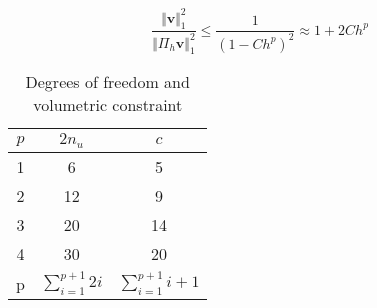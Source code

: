 \begin{equation}
\frac{\Vert \boldsymbol v \Vert_1^2}{\Vert \Pi_h \boldsymbol v \Vert_1^2} \le \frac{1}{(1-Ch^p)^2} \approx 1 + 2Ch^p
\end{equation}

\begin{table}[ht!]
\centering
\caption{Degrees of freedom and volumetric constraint}
\begin{tabular}{ccc}
\toprule
$p$ & $2n_u$ & $c$ \\
\midrule
1 & 6 & 5 \\
2 & 12 & 9 \\
3 & 20 & 14 \\
4 & 30 & 20 \\
p & $\sum_{i=1}^{p+1}2i$ & $\sum_{i=1}^{p+1}i+1$ \\
\bottomrule
\end{tabular}
\end{table}
